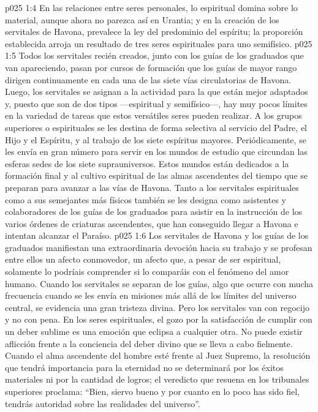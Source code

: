 \vs p025 1:4 \pc En las relaciones entre seres personales, lo espiritual domina sobre lo material, aunque ahora no parezca así en Urantia; y en la creación de los servitales de Havona, prevalece la ley del predominio del espíritu; la proporción establecida arroja un resultado de tres seres espirituales para uno semifísico.
\vs p025 1:5 \pc Todos los servitales recién creados, junto con los guías de los graduados que van apareciendo, pasan por cursos de formación que los guías de mayor rango dirigen continuamente en cada una de las siete vías circulatorias de Havona. Luego, los servitales se asignan a la actividad para la que están mejor adaptados y, puesto que son de dos tipos ---espiritual y semifísico---, hay muy pocos límites en la variedad de tareas que estos versátiles seres pueden realizar. A los grupos superiores o espirituales se les destina de forma selectiva al servicio del Padre, el Hijo y el Espíritu, y al trabajo de los siete espíritus mayores. Periódicamente, se les envía en gran número para servir en los mundos de estudio que circundan las esferas sedes de los siete suprauniversos. Estos mundos están dedicados a la formación final y al cultivo espiritual de las almas ascendentes del tiempo que se preparan para avanzar a las vías de Havona. Tanto a los servitales espirituales como a sus semejantes más físicos también se les designa como asistentes y colaboradores de los guías de los graduados para asistir en la instrucción de los varios órdenes de criaturas ascendentes, que han conseguido llegar a Havona e intentan alcanzar el Paraíso.
\vs p025 1:6 Los servitales de Havona y los guías de los graduados manifiestan una extraordinaria devoción hacia su trabajo y se profesan entre ellos un afecto conmovedor, un afecto que, a pesar de ser espiritual, solamente lo podríais comprender si lo comparáis con el fenómeno del amor humano. Cuando los servitales se separan de los guías, algo que ocurre con mucha frecuencia cuando se les envía en misiones más allá de los límites del universo central, se evidencia una gran tristeza divina. Pero los servitales van con regocijo y no con pena. En los seres espirituales, el gozo por la satisfacción de cumplir con un deber sublime es una emoción que eclipsa a cualquier otra. No puede existir aflicción frente a la conciencia del deber divino que se lleva a cabo fielmente. Cuando el alma ascendente del hombre esté frente al Juez Supremo, la resolución que tendrá importancia para la eternidad no se determinará por los éxitos materiales ni por la cantidad de logros; el veredicto que resuena en los tribunales superiores proclama: “Bien, siervo bueno y  por cuanto en lo poco has sido fiel, tendrás autoridad sobre las realidades del universo”.
